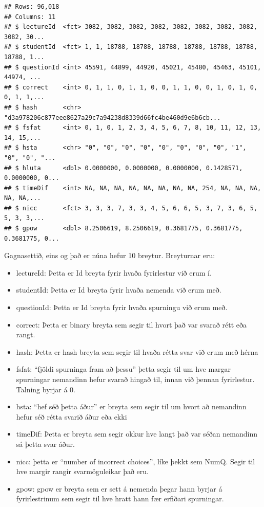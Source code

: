 \documentclass[
]{article}
\begin{document}
\begin{verbatim}
## Rows: 96,018
## Columns: 11
## $ lectureId  <fct> 3082, 3082, 3082, 3082, 3082, 3082, 3082, 3082, 3082, 30...
## $ studentId  <fct> 1, 1, 18788, 18788, 18788, 18788, 18788, 18788, 18788, 1...
## $ questionId <int> 45591, 44899, 44920, 45021, 45480, 45463, 45101, 44974, ...
## $ correct    <int> 0, 1, 1, 0, 1, 1, 0, 0, 1, 1, 0, 0, 1, 0, 1, 0, 0, 1, 1,...
## $ hash       <chr> "d3a978206c877eee8627a29c7a94238d8339d66fc4be460d9e6b6cb...
## $ fsfat      <int> 0, 1, 0, 1, 2, 3, 4, 5, 6, 7, 8, 10, 11, 12, 13, 14, 15,...
## $ hsta       <chr> "0", "0", "0", "0", "0", "0", "0", "0", "1", "0", "0", "...
## $ hluta      <dbl> 0.0000000, 0.0000000, 0.0000000, 0.1428571, 0.0000000, 0...
## $ timeDif    <int> NA, NA, NA, NA, NA, NA, NA, NA, 254, NA, NA, NA, NA, NA,...
## $ nicc       <fct> 3, 3, 3, 7, 3, 3, 4, 5, 6, 6, 5, 3, 7, 3, 6, 5, 5, 3, 3,...
## $ gpow       <dbl> 8.2506619, 8.2506619, 0.3681775, 0.3681775, 0.3681775, 0...
\end{verbatim}

Gagnasettið, eins og það er núna hefur 10 breytur. Breyturnar eru:

\begin{itemize}
\item
  lectureId: Þetta er Id breyta fyrir hvaða fyrirlestur við erum í.
\item
  studentId: Þetta er Id breyta fyrir hvaða nemenda við erum með.
\item
  questionId: Þetta er Id breyta fyrir hvaða spurningu við erum með.
\item
  correct: Þetta er binary breyta sem segir til hvort það var svarað rétt eða rangt.
\item
  hash: Þetta er hash breyta sem segir til hvaða rétta svar við erum með hérna
\item
  fsfat: ``fjöldi spurninga fram að þessu'' þetta segir til um hve margar spurningar nemandinn hefur svarað hingað til, innan við þennan fyrirlestur. Talning byrjar á 0.
\item
  hsta: ``hef séð þetta áður'' er breyta sem segir til um hvort að nemandinn hefur séð rétta svarið áður eða ekki
\item
  timeDif: Þetta er breyta sem segir okkur hve langt það var séðan nemandinn sá þetta svar áður.
\item
  nicc: þetta er ``number of incorrect choices'', líke þekkt sem NumQ. Segir til hve margir rangir svarmöguleikar það eru.
\item
  gpow: gpow er breyta sem er sett á nemenda þegar hann byrjar á fyrirlestrinum sem segir til hve hratt hann fær erfiðari spurningar.
\end{itemize}
\end{document}
